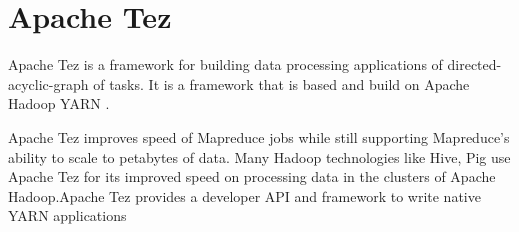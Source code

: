 \section{Apache Tez} 
Apache Tez is a framework for building data processing
applications of directed-acyclic-graph of tasks. It is a framework that is based
and build on Apache Hadoop YARN \cite{hid-sp18-401_apache_Tez}.
 
Apache Tez improves speed of Mapreduce jobs while still supporting Mapreduce’s
ability to scale to petabytes of data. Many Hadoop technologies like Hive, Pig
use Apache Tez for its improved speed on processing data in the clusters of
Apache Hadoop.Apache Tez provides a developer API and framework to write native
YARN applications \cite{hid-sp18-401_horton_Tez}
